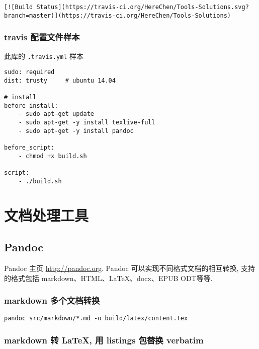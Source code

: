 \begin{lstlisting}
[![Build Status](https://travis-ci.org/HereChen/Tools-Solutions.svg?branch=master)](https://travis-ci.org/HereChen/Tools-Solutions)
\end{lstlisting}

\subsubsection{travis
配置文件样本}\label{travis-ux914dux7f6eux6587ux4ef6ux6837ux672c}

此库的 \lstinline!.travis.yml! 样本

\begin{lstlisting}
sudo: required
dist: trusty     # ubuntu 14.04

# install
before_install:
    - sudo apt-get update
    - sudo apt-get -y install texlive-full
    - sudo apt-get -y install pandoc

before_script:
    - chmod +x build.sh

script:
    - ./build.sh
\end{lstlisting}

\section{文档处理工具}\label{ux6587ux6863ux5904ux7406ux5de5ux5177}

\subsection{Pandoc}\label{pandoc}

Pandoc 主页 \url{http://pandoc.org}. Pandoc
可以实现不同格式文档的相互转换, 支持的格式包括
markdown、HTML、LaTeX、docx、EPUB ODT等等.

\subsubsection{markdown
多个文档转换}\label{markdown-ux591aux4e2aux6587ux6863ux8f6cux6362}

\begin{lstlisting}
pandoc src/markdown/*.md -o build/latex/content.tex
\end{lstlisting}

\subsubsection{markdown 转 LaTeX, 用 listings 包替换
verbatim}\label{markdown-ux8f6c-latex-ux7528-listings-ux5305ux66ffux6362-verbatim}

